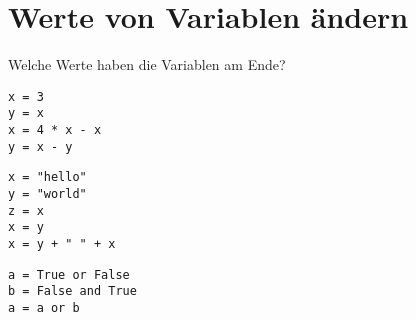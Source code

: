 \documentclass[class=scrartcl, crop=false]{standalone}
\begin{document}
\section{Werte von Variablen ändern}


\begin{aufgabe} \noindent

Welche Werte haben die Variablen am Ende?
\begin{teilaufgaben}
\teilaufgabe \begin{verbatim}
x = 3
y = x
x = 4 * x - x
y = x - y
\end{verbatim}

\teilaufgabe \begin{verbatim}
x = "hello"
y = "world"
z = x
x = y
x = y + " " + x
\end{verbatim}
\teilaufgabe
\begin{verbatim}
a = True or False
b = False and True
a = a or b
\end{verbatim}

\end{teilaufgaben}


\end{aufgabe}
\end{document}
